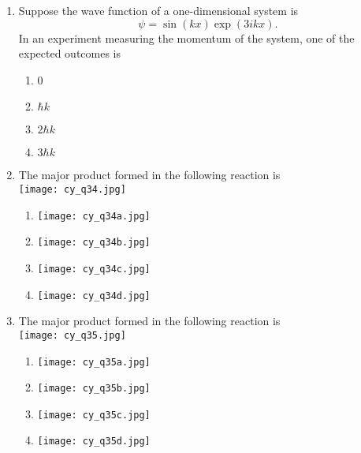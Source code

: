 \documentclass[12pt]{article}
\begin{document}
\begin{enumerate}[label=Q.\arabic*]
					\item Suppose the wave function of a one-dimensional system is \\
						\[
							\psi = \sin(kx)\exp(3ikx).
							\]
							In an experiment measuring the momentum of the system, one of the expected outcomes is  
							\begin{enumerate}
							\item 0
							\item $\hbar k$
							\item $2\hbar k$
							\item $3\hbar k$
							\end{enumerate}
							\item The major product formed in the following reaction is\\[1ex]
							\texttt{[image: cy\_q34.jpg]}\\[-1ex]
							\begin{multicols}{2}
							\begin{enumerate}
							\item \texttt{[image: cy\_q34a.jpg]}
							\item \texttt{[image: cy\_q34b.jpg]}
							\item \texttt{[image: cy\_q34c.jpg]}
							\item \texttt{[image: cy\_q34d.jpg]}
							\end{enumerate}
							\end{multicols}

							\item The major product formed in the following reaction is\\[1ex]
							\texttt{[image: cy\_q35.jpg]}\\[-1ex]
							\begin{multicols}{2}
							\begin{enumerate}
							\item \texttt{[image: cy\_q35a.jpg]}
							\item \texttt{[image: cy\_q35b.jpg]}
							\item \texttt{[image: cy\_q35c.jpg]}
							\item \texttt{[image: cy\_q35d.jpg]}
							\end{enumerate}
							\end{multicols}


\end{enumerate}
\end{document}
